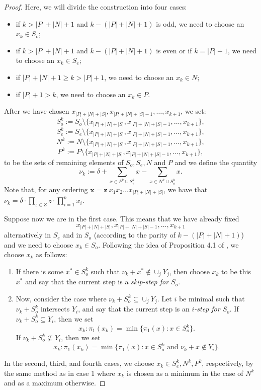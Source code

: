 \documentclass[11pt]{amsart}
\theoremstyle{definition}
\newcommand{\bx}{\mathbf{x}}
\begin{document}
\begin{proof}
Here, we will divide the construction into four cases:
\begin{itemize}
\item[1)] if $k>|P|+|N|+1$ and $k-(|P|+|N|+1)$ is odd, we need to choose an $x_k\in S_o$;
\item[2)] if $k>|P|+|N|+1$ and $k-(|P|+|N|+1)$ is even or if $k=|P|+1$, we need to choose an $x_k\in S_e$;
\item[3)] if $|P|+|N|+1\geq k>|P|+1$, we need to choose an $x_k\in N$;
\item[4)] if $|P|+1>k$, we need to choose an $x_k\in P$.
\end{itemize}
After we have chosen $x_{|P|+|N|+|S|}, x_{|P|+|N|+|S|-1}, \dots, x_{k+1}$, we set:
$$S_o^k:=S_o\setminus\{x_{|P|+|N|+|S|}, x_{|P|+|N|+|S|-1}, \dots, x_{k+1}\},$$
 $$S_e^k:=S_e\setminus\{x_{|P|+|N|+|S|}, x_{|P|+|N|+|S|-1}, \dots, x_{k+1}\}, $$
$$N^k:=N\setminus\{x_{|P|+|N|+|S|}, x_{|P|+|N|+|S|-1}, \dots, x_{k+1}\},$$ 
 $$P^k:=P\setminus\{x_{|P|+|N|+|S|}, x_{|P|+|N|+|S|-1}, \dots, x_{k+1}\}, $$
to be the sets of remaining elements of $S_o, S_e, N$ and $P$ and we define the quantity
$$\nu_k:=\delta+\sum_{x\in P^k\cup S_e^k} x -\sum_{x\in N^k\cup S_o^k} x.$$
Note that, for any ordering $\bx=\mathbf{z}\ x_1x_2\dots x_{|P|+|N|+|S|}$, we have that $\nu_k= \delta \cdot \prod_{z \in Z} z \cdot \prod_{i=1}^k x_i$.

Suppose now we are in the first case. This means that we have already fixed 
$$x_{|P|+|N|+|S|}, x_{|P|+|N|+|S|-1}, \dots, x_{k+1}$$ alternatively in $S_e$ and in $S_o$ (according to the parity of $k-(|P|+|N|+1)$) and we need to choose $x_k\in S_o$.
Following the idea of Proposition 4.1 of \cite{BK}, we choose $x_k$ as follows:
\begin{enumerate}
\item If there is some $x^*\in S_o^k$ such that $\nu_k+x^* \notin \cup_j Y_j$, then choose $x_k$ to be this $x^*$ and say that the current step is a \emph{skip-step for $S_o$}.

\item  Now, consider the case where $\nu_k+S_o^k \subseteq \cup_j Y_j$.  Let $i$ be minimal such that $\nu_k+S_o^k$ intersects $Y_i$, and say that the current step is an \emph{$i$-step for $S_o$}.  If $\nu_k+S_o^k\subseteq Y_i$, then we set
$$x_k: \pi_1(x_k)=\min \{\pi_1(x): x\in S_o^k\}.$$
If $\nu_k+ S_o^k \not\subseteq Y_i$, then
we set
$$x_k: \pi_1(x_k)=\min \{\pi_1(x): x\in S_o^k \mbox{ and }\nu_k+x\not\in Y_i\}.$$
\end{enumerate}
In the second, third, and fourth cases, we choose $x_k \in S^k_e, N^k, P^k$, respectively, by the same method as in case 1 where $x_k$ is chosen as a minimum in the case of $N^k$ and as a maximum otherwise. 


\end{proof}
\end{document}
